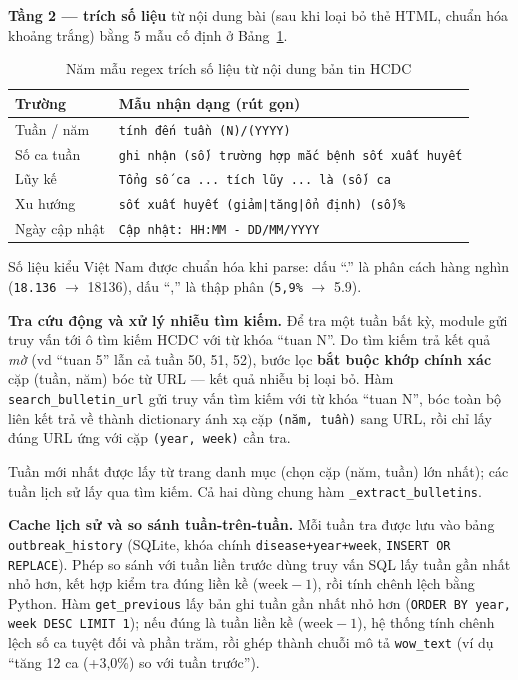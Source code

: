 \documentclass[a4paper,13pt,3p,oneside]{report}
\theoremstyle{definition}
\theoremstyle{remark}
\theoremstyle{definition}
\begin{document}
\textbf{Tầng 2 --- trích số liệu} từ nội dung bài (sau khi loại bỏ thẻ HTML, chuẩn hóa khoảng trắng) bằng 5 mẫu cố định ở Bảng~\ref{tab:outbreak-regex}.

\begin{table}[H]
\centering
\begin{tabular}{|l|p{8.5cm}|}
\hline
\textbf{Trường} & \textbf{Mẫu nhận dạng (rút gọn)} \\
\hline
Tuần / năm   & \texttt{tính đến tuần (N)/(YYYY)} \\
\hline
Số ca tuần   & \texttt{ghi nhận (số) trường hợp mắc bệnh sốt xuất huyết} \\
\hline
Lũy kế       & \texttt{Tổng số ca ... tích lũy ... là (số) ca} \\
\hline
Xu hướng     & \texttt{sốt xuất huyết (giảm|tăng|ổn định) (số)\%} \\
\hline
Ngày cập nhật & \texttt{Cập nhật: HH:MM - DD/MM/YYYY} \\
\hline
\end{tabular}
\caption{Năm mẫu regex trích số liệu từ nội dung bản tin HCDC}
\label{tab:outbreak-regex}
\end{table}

Số liệu kiểu Việt Nam được chuẩn hóa khi parse: dấu ``.'' là phân cách hàng nghìn (\texttt{18.136} $\to$ 18136), dấu ``,'' là thập phân (\texttt{5,9\%} $\to$ 5.9).

\textbf{Tra cứu động và xử lý nhiễu tìm kiếm.} Để tra một tuần bất kỳ, module gửi truy vấn tới ô tìm kiếm HCDC với từ khóa ``tuan N''. Do tìm kiếm trả kết quả \textit{mờ} (vd ``tuan 5'' lẫn cả tuần 50, 51, 52), bước lọc \textbf{bắt buộc khớp chính xác} cặp (tuần, năm) bóc từ URL --- kết quả nhiễu bị loại bỏ. Hàm \texttt{search\_bulletin\_url} gửi truy vấn tìm kiếm với từ khóa ``tuan N'', bóc toàn bộ liên kết trả về thành dictionary ánh xạ cặp \texttt{(năm, tuần)} sang URL, rồi chỉ lấy đúng URL ứng với cặp \texttt{(year, week)} cần tra.

Tuần mới nhất được lấy từ trang danh mục (chọn cặp (năm, tuần) lớn nhất); các tuần lịch sử lấy qua tìm kiếm. Cả hai dùng chung hàm \texttt{\_extract\_bulletins}.

\textbf{Cache lịch sử và so sánh tuần-trên-tuần.} Mỗi tuần tra được lưu vào bảng \texttt{outbreak\_history} (SQLite, khóa chính \texttt{disease+year+week}, \texttt{INSERT OR REPLACE}). Phép so sánh với tuần liền trước dùng truy vấn SQL lấy tuần gần nhất nhỏ hơn, kết hợp kiểm tra đúng liền kề ($\text{week}-1$), rồi tính chênh lệch bằng Python. Hàm \texttt{get\_previous} lấy bản ghi tuần gần nhất nhỏ hơn (\texttt{ORDER BY year, week DESC LIMIT 1}); nếu đúng là tuần liền kề ($\text{week}-1$), hệ thống tính chênh lệch số ca tuyệt đối và phần trăm, rồi ghép thành chuỗi mô tả \texttt{wow\_text} (ví dụ ``tăng 12 ca (+3{,}0\%) so với tuần trước'').
\end{document}
